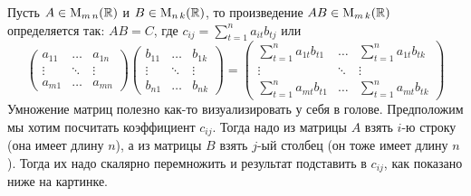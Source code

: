 Пусть $A\in\operatorname{M}_{m\,n}(\mathbb R)$ и $B\in\operatorname{M}_{n\,k}(\mathbb R)$, то произведение $AB\in\operatorname{M}_{m\,k}(\mathbb R)$ определяется так: $AB = C$, где $c_{ij} = \sum_{t=1}^n a_{it}b_{tj}$ или
\[
\begin{pmatrix}
a_{11}&\ldots& a_{1n}\\
\vdots&\ddots&\vdots\\
a_{m1}& \ldots &a_{mn}
\end{pmatrix}
\begin{pmatrix}
b_{11}&\ldots& b_{1k}\\
\vdots&\ddots&\vdots\\
b_{n1}& \ldots &b_{nk}
\end{pmatrix}
=\begin{pmatrix}
\sum_{t=1}^n a_{1t}b_{t1}&\ldots& \sum_{t=1}^n a_{1t}b_{tk}\\
\vdots&\ddots&\vdots\\
\sum_{t=1}^n a_{mt}b_{t1}& \ldots &\sum_{t=1}^n a_{mt}b_{tk}
\end{pmatrix}
\]
Умножение матриц полезно как-то визуализировать у себя в голове.
Предположим мы хотим посчитать коэффициент $c_{ij}$.
Тогда надо из матрицы $A$ взять $i$-ю строку (она имеет длину $n$), а из матрицы $B$ взять $j$-ый столбец (он тоже имеет длину $n$).
Тогда их надо скалярно перемножить и результат подставить в $c_{ij}$, как показано ниже на картинке.
